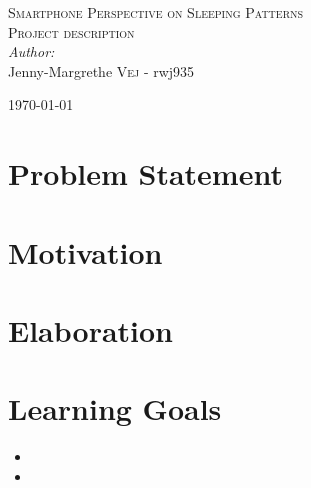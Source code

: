 \documentclass[12pt]{article}
\begin{document}

\begin{center}
\textsc{\Large Smartphone Perspective on Sleeping Patterns}\\[0.5cm] 
\textsc{\large Project description}\\[0.5cm] 


\emph{Author:}
\\
Jenny-Margrethe \textsc{Vej} - rwj935\\ 
\vspace{10mm}

{\large \today}\\[3cm] 
\end{center}
\vspace{-20mm}

\section{Problem Statement}

\section{Motivation}

\section{Elaboration}

\section{Learning Goals}
	\begin{itemize}
		\item 
		\item 
	\end{itemize}






\end{document}
